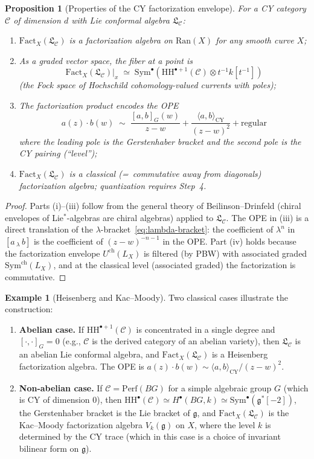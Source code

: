 \documentclass[11pt]{article}
\theoremstyle{plain}
\newtheorem{proposition}[theorem]{Proposition}
\theoremstyle{definition}
\newtheorem{example}[theorem]{Example}
\theoremstyle{remark}
\newcommand{\Sym}{\mathrm{Sym}}
\newcommand{\CY}{\mathrm{CY}}
\newcommand{\HH}{\mathrm{HH}}
\newcommand{\Ran}{\mathrm{Ran}}
\newcommand{\Fact}{\mathrm{Fact}}
\newcommand{\Perf}{\mathrm{Perf}}
\newcommand{\cC}{\mathcal{C}}
\newcommand{\frakg}{\mathfrak{g}}
\newcommand{\frakL}{\mathfrak{L}}
\begin{document}
\begin{proposition}[Properties of the CY factorization envelope]
\label{prop:fact-properties}
For a CY category $\cC$ of dimension $d$ with Lie conformal algebra $\frakL_\cC$:
\begin{enumerate}[label=(\roman*)]
\item $\Fact_X(\frakL_\cC)$ is a factorization algebra on $\Ran(X)$ for any smooth curve $X$;
\item As a graded vector space, the fiber at a point is
\[
\Fact_X(\frakL_\cC)|_x \;\simeq\; \Sym^\bullet(\HH^{\bullet+1}(\cC) \otimes t^{-1}k[t^{-1}])
\]
(the Fock space of Hochschild cohomology-valued currents with poles);
\item The factorization product encodes the OPE
\[
a(z) \cdot b(w) \;\sim\; \frac{[a,b]_G(w)}{z-w} + \frac{\langle a, b \rangle_{\CY}}{(z-w)^2} + \text{regular}
\]
where the leading pole is the Gerstenhaber bracket and the second pole is the CY pairing (``level'');
\item $\Fact_X(\frakL_\cC)$ is a \emph{classical} (=~commutative away from diagonals) factorization algebra; quantization requires Step~4.
\end{enumerate}
\end{proposition}

\begin{proof}
Parts (i)--(iii) follow from the general theory of Beilinson--Drinfeld (chiral envelopes of Lie$^*$-algebras are chiral algebras) applied to $\frakL_\cC$. The OPE in (iii) is a direct translation of the $\lambda$-bracket~\eqref{eq:lambda-bracket}: the coefficient of $\lambda^n$ in $[a \,{}_\lambda\, b]$ is the coefficient of $(z-w)^{-n-1}$ in the OPE. Part (iv) holds because the factorization envelope $U^{\mathrm{ch}}(L_X)$ is filtered (by PBW) with associated graded $\Sym^{\mathrm{ch}}(L_X)$, and at the classical level (associated graded) the factorization is commutative.
\end{proof}

\begin{example}[Heisenberg and Kac--Moody]
\label{ex:heisenberg-km}
Two classical cases illustrate the construction:
\begin{enumerate}[label=(\alph*)]
\item \textbf{Abelian case.}\; If $\HH^{\bullet+1}(\cC)$ is concentrated in a single degree and $[\cdot, \cdot]_G = 0$ (e.g., $\cC$ is the derived category of an abelian variety), then $\frakL_\cC$ is an abelian Lie conformal algebra, and $\Fact_X(\frakL_\cC)$ is a Heisenberg factorization algebra. The OPE is $a(z) \cdot b(w) \sim \langle a, b \rangle_{\CY} / (z-w)^2$.
\item \textbf{Non-abelian case.}\; If $\cC = \Perf(BG)$ for a simple algebraic group $G$ (which is CY of dimension 0), then $\HH^\bullet(\cC) \simeq H^\bullet(BG, k) \simeq \Sym^\bullet(\frakg^*[-2])$, the Gerstenhaber bracket is the Lie bracket of $\frakg$, and $\Fact_X(\frakL_\cC)$ is the Kac--Moody factorization algebra $V_k(\frakg)$ on $X$, where the level $k$ is determined by the CY trace (which in this case is a choice of invariant bilinear form on $\frakg$).
\end{enumerate}
\end{example}
\end{document}
